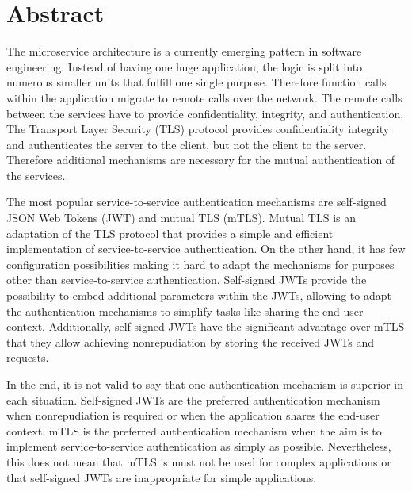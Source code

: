 \chapter{Abstract}
The microservice architecture is a currently emerging pattern in software engineering.
Instead of having one huge application, the logic is split into numerous smaller units that fulfill one single purpose.
Therefore function calls within the application migrate to remote calls over the network.
The remote calls between the services have to provide confidentiality, integrity, and authentication.
The Transport Layer Security (TLS) protocol provides confidentiality integrity and authenticates the server to the client, but not the client to the server.
Therefore additional mechanisms are necessary for the mutual authentication of the services.

The most popular service-to-service authentication mechanisms are self-signed JSON Web Tokens (JWT) and mutual TLS (mTLS).
Mutual TLS is an adaptation of the TLS protocol that provides a simple and efficient implementation of service-to-service authentication.
On the other hand, it has few configuration possibilities making it hard to adapt the mechanisms for purposes other than service-to-service authentication.
Self-signed JWTs provide the possibility to embed additional parameters within the JWTs, allowing to adapt the authentication mechanisms to simplify tasks like sharing the end-user context.
Additionally, self-signed JWTs have the significant advantage over mTLS that they allow achieving nonrepudiation by storing the received JWTs and requests.

In the end, it is not valid to say that one authentication mechanism is superior in each situation.
Self-signed JWTs are the preferred authentication mechanism when nonrepudiation is required or when the application shares the end-user context.
mTLS is the preferred authentication mechanism when the aim is to implement service-to-service authentication as simply as possible.
Nevertheless, this does not mean that mTLS is must not be used for complex applications or that self-signed JWTs are inappropriate for simple applications.
